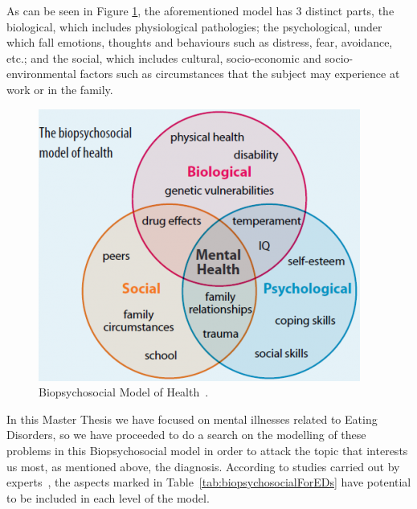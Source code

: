 As can be seen in Figure \ref{fig:biopsychosocial}, the aforementioned model has 3 distinct parts, the biological, which includes physiological pathologies; the psychological, under which fall emotions, thoughts and behaviours such as distress, fear, avoidance, etc.; and the social, which includes cultural, socio-economic and socio-environmental factors such as circumstances that the subject may experience at work or in the family.

\begin{figure}[!htp]
    \centering
    \includegraphics[scale=0.65]{img/state-of-art/biopsychosocial model.png}
    \caption{Biopsychosocial Model of Health~\cite{Biopsych52:online}.}
    \label{fig:biopsychosocial}
\end{figure}


In this Master Thesis we have focused on mental illnesses related to Eating Disorders, so we have proceeded to do a search on the modelling of these problems in this Biopsychosocial model in order to attack the topic that interests us most, as mentioned above, the diagnosis. According to studies carried out by experts~\cite{WhatCaus58:online}, the aspects marked in Table~\ref{tab:biopsychosocialForEDs} have potential to be included in each level of the model.

